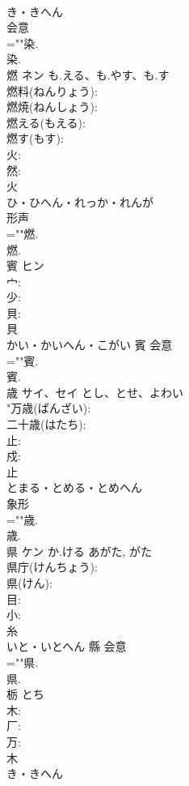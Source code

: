 \documentclass[8pt]{extreport}
\begin{document}
\begin{CJK}{UTF8}{min}
\\	き・きへん	
\\	会意 
\\	=""染.
\\	染.
\\	燃	ネン	も.える、も.やす、も.す		
\\	燃料(ねんりょう): 
\\	燃焼(ねんしょう): 
\\	燃える(もえる): 
\\	燃す(もす): 
\\	火: 
\\	然: 
\\	火	
\\	ひ・ひへん・れっか・れんが	
\\	形声 
\\	=""燃.
\\	燃.
\\	賓	ヒン			
\\	宀: 
\\	少: 
\\	貝: 
\\	貝	
\\	かい・かいへん・こがい	賓	会意 
\\	=""賓.
\\	賓.
\\	歳	サイ、セイ	とし、とせ、よわい		
\\	"万歳(ばんざい): 
\\	二十歳(はたち): 
\\	止: 
\\	戍: 
\\	止	
\\	とまる・とめる・とめへん	
\\	象形 
\\	=""歳.
\\	歳.
\\	県	ケン	か.ける	あがた, がた	
\\	県庁(けんちょう): 
\\	県(けん): 
\\	目: 
\\	小: 
\\	糸	
\\	いと・いとへん	縣	会意 
\\	=""県.
\\	県.
\\	栃		とち		
\\	木: 
\\	厂: 
\\	万: 
\\	木	
\\	き・きへん	

\end{CJK}
\end{document}
